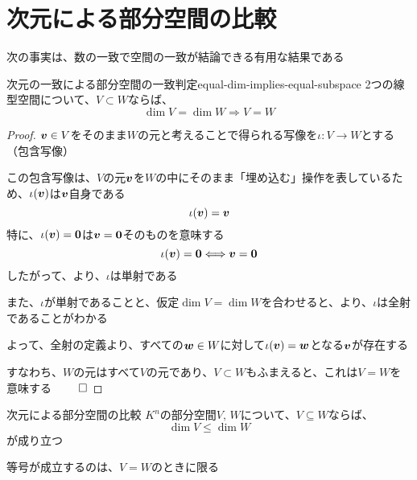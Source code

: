 \documentclass[../../../topic_linear-algebra]{subfiles}
\begin{document}
\sectionline
\section{次元による部分空間の比較}

次の事実は、数の一致で空間の一致が結論できる有用な結果である

\begin{theorem}{次元の一致による部分空間の一致判定}{equal-dim-implies-equal-subspace}
  2つの線型空間について、$V \subset W$ならば、
  \begin{equation*}
    \dim V = \dim W \Longrightarrow V = W
  \end{equation*}
\end{theorem}

\begin{proof}
  $\vb*{v} \in V$をそのまま$W$の元と考えることで得られる写像を$\iota \colon V \to W$とする（包含写像）

  \br

  この包含写像は、$V$の元$\vb*{v}$を$W$の中にそのまま「埋め込む」操作を表しているため、$\iota(\vb*{v})$は$\vb*{v}$自身である
  \begin{equation*}
    \iota(\vb*{v}) = \vb*{v}
  \end{equation*}
  特に、$\iota(\vb*{v}) = \vb*{0}$は$\vb*{v} = \vb*{0}$そのものを意味する
  \begin{equation*}
    \iota(\vb*{v}) = \vb*{0} \Longleftrightarrow \vb*{v} = \vb*{0}
  \end{equation*}
  したがって、より、$\iota$は単射である

  \br

  また、$\iota$が単射であることと、仮定$\dim V = \dim W$を合わせると、より、$\iota$は全射であることがわかる

  \br

  よって、全射の定義より、すべての$\vb*{w} \in W$に対して$\iota(\vb*{v}) = \vb*{w}$となる$\vb*{v}$が存在する

  すなわち、$W$の元はすべて$V$の元であり、$V \subset W$もふまえると、これは$V=W$を意味する $\qed$
\end{proof}

\sectionline

\begin{theorem*}{次元による部分空間の比較}
  $K^n$の部分空間$V,\,W$について、$V \subseteq W$ならば、
  \begin{equation*}
    \dim V \leq \dim W
  \end{equation*}
  が成り立つ

  等号が成立するのは、$V = W$のときに限る
\end{theorem*}
\end{document}
